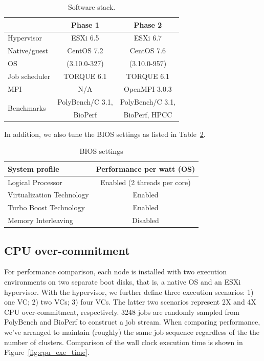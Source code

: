 \begin{table}[!h]\small
  \caption{Software stack.}
  \centering
    \begin{tabular}{|l|c|c|}
    \hline
     & Phase 1 & Phase 2 \\
    \hline
    Hypervisor & ESXi 6.5 & ESXi 6.7 \\
    \hline
    Native/guest  & CentOS 7.2 & CentOS 7.6 \\
         OS       & (3.10.0-327) & (3.10.0-957) \\
    \hline
    Job scheduler & TORQUE 6.1 & TORQUE 6.1 \\
    \hline
    MPI & N/A & OpenMPI 3.0.3 \\
    \hline
    \multirow{2}{*}{Benchmarks} & PolyBench/C 3.1,  &  PolyBench/C 3.1,  \\
                                & BioPerf & BioPerf, HPCC \\  
    \hline
    \end{tabular}
  \label{tbl:software}
\end{table}

In addition, we also tune the BIOS settings as listed in Table~\ref{tbl:bios}.

\begin{table}[!h]\small
  \caption{BIOS settings}
  \centering
    \begin{tabular}{|l|c|}
    \hline
    System profile & Performance per watt (OS) \\
    \hline
    Logical Processor  & Enabled (2 threads per core) \\
    \hline
    Virtualization Technology & Enabled \\
    \hline
    Turbo Boost Technology & Enabled \\
    \hline
    Memory Interleaving & Disabled \\
    \hline
    \end{tabular}
  \label{tbl:bios}
\end{table}


\subsection{CPU over-commitment}
For performance comparison, each node is installed with two execution environments on two separate boot disks, that is, a native OS and an ESXi hypervisor. With the hypervisor, we further define three execution scenarios: 1) one VC; 2) two VCs; 3) four VCs. The latter two scenarios represent 2X and 4X CPU over-commitment, respectively. 3248 jobs are randomly sampled from PolyBench and BioPerf to construct a job stream. 
When comparing performance, we've arranged to maintain (roughly) the same job sequence 
regardless of the the number of clusters. Comparison of the wall clock execution time is shown in Figure~\ref{fig:cpu_exe_time}.


